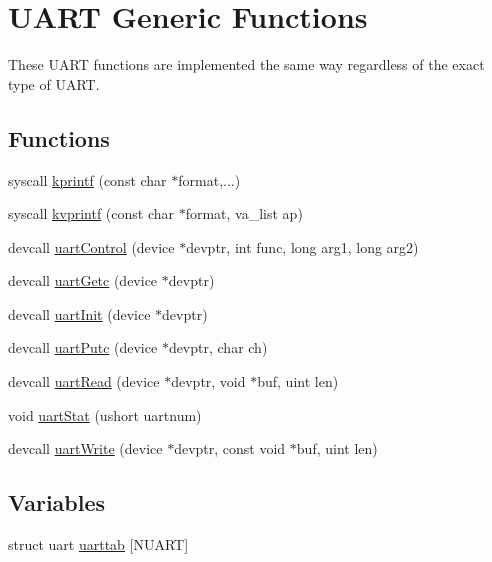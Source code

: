 \hypertarget{group__uartgeneric}{\section{U\-A\-R\-T Generic Functions}
\label{group__uartgeneric}
}


These U\-A\-R\-T functions are implemented the same way regardless of the exact type of U\-A\-R\-T.  


\subsection*{Functions}
\begin{DoxyCompactItemize}
\item 
syscall \hyperlink{group__uartgeneric_ga6a11716b0c463862ca01de0b540fc68c}{kprintf} (const char $\ast$format,...)
\item 
syscall \hyperlink{group__uartgeneric_gaf634f79d4d8266eef152ce9f6566eb7d}{kvprintf} (const char $\ast$format, va\-\_\-list ap)
\item 
devcall \hyperlink{group__uartgeneric_ga14d3c8fd167b9675c24d31202a98a157}{uart\-Control} (device $\ast$devptr, int func, long arg1, long arg2)
\item 
devcall \hyperlink{group__uartgeneric_gab370a669e99ede545549211cfb660010}{uart\-Getc} (device $\ast$devptr)
\item 
devcall \hyperlink{group__uartgeneric_gaaddd148902bf1ef9d260ce4a098bdcf8}{uart\-Init} (device $\ast$devptr)
\item 
devcall \hyperlink{group__uartgeneric_ga69b15b2d7c40d2b80462646c68e2030a}{uart\-Putc} (device $\ast$devptr, char ch)
\item 
devcall \hyperlink{group__uartgeneric_ga9ae71c7b0411efdeebe223f1b23897c6}{uart\-Read} (device $\ast$devptr, void $\ast$buf, uint len)
\item 
void \hyperlink{group__uartgeneric_ga22a7e0cd3b663a3ae8fc817afa382455}{uart\-Stat} (ushort uartnum)
\item 
devcall \hyperlink{group__uartgeneric_gafdc38699ceaecbc01f0fa8bf79213f84}{uart\-Write} (device $\ast$devptr, const void $\ast$buf, uint len)
\end{DoxyCompactItemize}
\subsection*{Variables}
\begin{DoxyCompactItemize}
\item 
struct uart \hyperlink{group__uartgeneric_gaaba973119f71b1422dd48f51eb1dca51}{uarttab} \mbox{[}N\-U\-A\-R\-T\mbox{]}
\end{DoxyCompactItemize}


